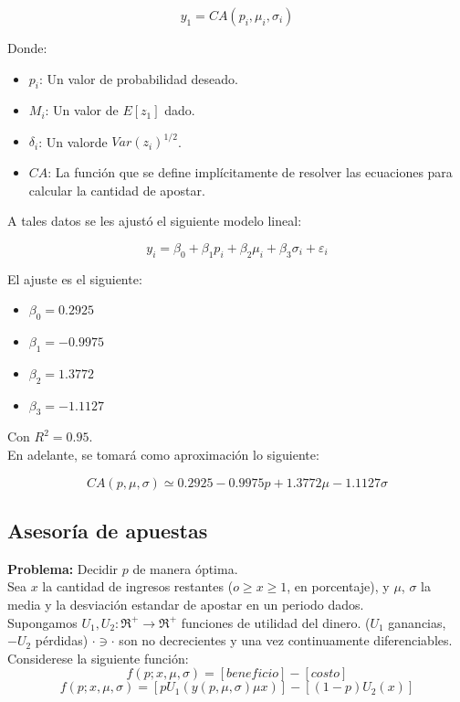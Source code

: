 \[y_1=CA(p_i,\mu_i,\sigma_i)\]

Donde:
\begin{itemize}
 \item $p_i$: Un valor de probabilidad deseado.
 \item $M_i$: Un valor de $E[z_1]$ dado.
 \item $\delta_i$: Un valorde $Var(z_i)^{1/2}$.
 \item $CA$: La función que se define implícitamente de resolver las ecuaciones para calcular la cantidad de apostar.
\end{itemize}

A tales datos se les ajustó el siguiente modelo lineal:

\[y_i=\beta_0+\beta_1p_i+\beta_2\mu_i+\beta_3\sigma_i+\varepsilon_i\]

\newpage

El ajuste es el siguiente:

\begin{itemize}
 \item $\beta_0=0.2925$
  \item $\beta_1=-0.9975$
 \item $\beta_2=1.3772$
 \item $\beta_3=-1.1127$
\end{itemize}

Con $R^2=0.95$.\\

En adelante, se tomará como aproximación lo siguiente:

\[CA(p,\mu,\sigma)\simeq0.2925-0.9975p+1.3772\mu-1.1127\sigma\]

\subsection{Asesoría de apuestas}
{\bf Problema:} Decidir $p$ de manera óptima.\\

Sea $x$ la cantidad de ingresos restantes ($o\ge x\ge1$, en porcentaje), y $\mu$, $\sigma$ la media y la desviación estandar de apostar en un periodo dados.\\

Supongamos $U_1,U_2: \Re^+\rightarrow \Re^+$ funciones de utilidad del dinero. ($U_1$ ganancias, $-U_2$ pérdidas) $\cdot\ni\cdot$ son no decrecientes y una vez continuamente diferenciables. Considerese la siguiente función:\\

\[f(p;x,\mu,\sigma)=[beneficio]-[costo]\]
\[f(p;x,\mu,\sigma)=[pU_1(y(p,\mu,\sigma)\mu x)]-[(1-p)U_2(x)]\]\\

